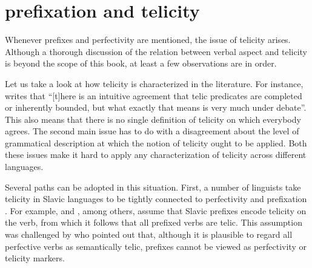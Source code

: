 \section{prefixation  and telicity}\label{section:new:telicity}
Whenever prefixes and perfectivity are mentioned, the issue of telicity arises. Although a thorough discussion of the relation between verbal aspect and telicity is beyond the scope of this book, at least a few observations are in order. %

Let us take a look at how telicity is characterized in the literature. For instance, \citet[3]{Rothstein:08a} writes that ``[t]here is an intuitive agreement that telic predicates are completed or inherently bounded, but what exactly that means is very much under debate''. This also means that there is no single definition of telicity on which everybody agrees. The second main issue has to do with a disagreement about the level of grammatical description at which the notion of telicity ought to be applied. Both these issues make it hard to apply any characterization of telicity across different languages. 

Several paths can be adopted in this situation. First, a number of linguists take telicity in Slavic languages to be tightly connected to perfectivity and prefixation . For example, \citet{Borer:03} and \citet{vanHout:08}, among others, assume that Slavic prefixes encode telicity on the verb, from which it follows that all prefixed verbs are telic. This assumption was challenged by \citet{Filip:03} who pointed out that, although it is plausible to regard all perfective verbs  as semantically telic, prefixes cannot be viewed as perfectivity or telicity markers.  

